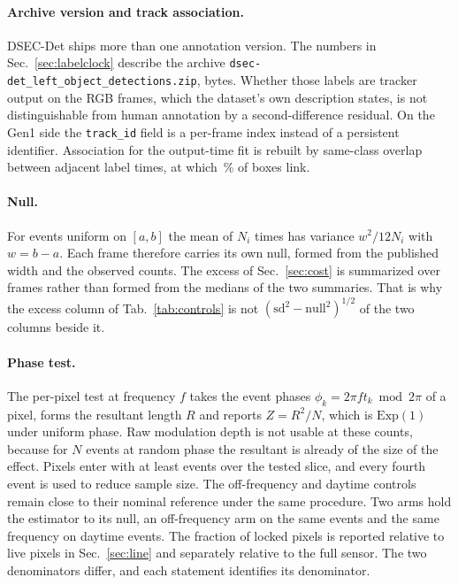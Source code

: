 \documentclass[10pt,twocolumn,letterpaper]{article}
\begin{document}
\paragraph{Archive version and track association.} DSEC-Det ships more than
one annotation version. The numbers in Sec.~\ref{sec:labelclock} describe the archive
\texttt{dsec-det\_left\_object\_detections.zip}, \ddArchiveBytes{} bytes. Whether those labels are tracker output on the RGB
frames, which the dataset's own description states, is not distinguishable from
human annotation by a second-difference residual. On the Gen1 side the
\texttt{track\_id} field is a per-frame index instead of a persistent identifier.
Association for the output-time fit is rebuilt by same-class overlap between
adjacent label times, at which \outLinkPct\,\% of boxes link.

\paragraph{Null.} For events uniform on $[a,b]$ the mean of $N_{i}$ times has
variance $w^{2}/12N_{i}$ with $w=b-a$. Each frame therefore carries its own null,
formed from the published width and the observed counts. The excess of
Sec.~\ref{sec:cost} is summarized over frames rather than formed from the medians of the two
summaries. That is why the excess column of Tab.~\ref{tab:controls} is not
$(\mathrm{sd}^{2}-\mathrm{null}^{2})^{1/2}$ of the two columns beside it.

\paragraph{Phase test.} The per-pixel test at frequency $f$ takes the event phases
$\phi_{k}=2\pi f t_{k} \bmod 2\pi$ of a pixel, forms the resultant length $R$ and
reports $Z=R^{2}/N$, which is $\mathrm{Exp}(1)$ under uniform phase. Raw
modulation depth is not usable at these counts, because for $N$ events at random
phase the resultant is already of the size of the effect. Pixels enter with at
least \flickerMinEvents{} events over the tested slice, and every fourth event is
used to reduce sample size. The off-frequency and daytime controls remain close
to their nominal reference under the same procedure. Two arms hold the estimator to its null, an
off-frequency arm on the same events and the same frequency on daytime events.
The fraction of locked pixels is reported relative to live pixels in Sec.~\ref{sec:line} and
separately relative to the full sensor. The two denominators differ, and each statement
identifies its denominator.
\end{document}
